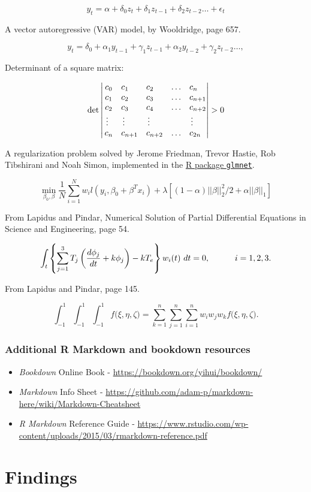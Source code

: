 \documentclass[12pt,oneside]{chicagocapstone}
\begin{document}
\[ y_t = \alpha + \delta_0 z_t + \delta_1 z_{t-1} + \delta_2 z_{t-2} \ldots + \epsilon_t\]

A vector autoregressive (VAR) model, by Wooldridge, page 657.

\[ y_t = \delta_0 + \alpha_1 y_{t-1} + \gamma_1 z_{t-1} + \alpha_2 y_{t-2} + \gamma_2 z_{t-2} \ldots,\]
\newpage

Determinant of a square matrix:

\[\det\left|\,\begin{matrix}%
c_0&c_1\hfill&c_2\hfill&\ldots&c_n\hfill\cr
c_1&c_2\hfill&c_3\hfill&\ldots&c_{n+1}\hfill\cr
c_2&c_3\hfill&c_4\hfill&\ldots&c_{n+2}\hfill\cr
\,\vdots\hfill&\,\vdots\hfill&
  \,\vdots\hfill&&\,\vdots\hfill\cr
c_n&c_{n+1}\hfill&c_{n+2}\hfill&\ldots&c_{2n}\hfill\cr
\end{matrix}\right|>0\]
\bigskip

A regularization problem solved by Jerome Friedman, Trevor Hastie, Rob Tibshirani and Noah Simon, implemented in the \href{https://cran.r-project.org/web/packages/glmnet/index.html}{R package \texttt{glmnet}}.

\[ \min_{\beta_0,\beta} \frac{1}{N}\sum_{i=1}^N w_il(y_i,\beta_0+\beta^Tx_i)+\lambda \left[(1-\alpha) ||\beta||_2^2/2+\alpha||\beta||_1\right]\]

\bigskip

From Lapidus and Pindar, Numerical Solution of Partial Differential Equations in Science and Engineering, page 54.

\[\int_t\left\{\sum_{j=1}^3 T_j \left({d\phi_j\over dt}+k\phi_j\right)-kT_e\right\}w_i(t)\ dt=0, \qquad\quad i=1,2,3.\]

\bigskip

From Lapidus and Pindar, page 145.

\[\int_{-1}^1\!\int_{-1}^1\!\int_{-1}^1 f\big(\xi,\eta,\zeta\big) = \sum_{k=1}^n\sum_{j=1}^n\sum_{i=1}^n w_i w_j w_k f\big( \xi,\eta,\zeta\big).\]

\hypertarget{additional-r-markdown-and-bookdown-resources}{%
\subsection*{Additional R Markdown and bookdown resources}\label{additional-r-markdown-and-bookdown-resources}}
\begin{itemize}
\item
  \emph{Bookdown} Online Book - \url{https://bookdown.org/yihui/bookdown/}
\item
  \emph{Markdown} Info Sheet - \url{https://github.com/adam-p/markdown-here/wiki/Markdown-Cheatsheet}
\item
  \emph{R Markdown} Reference Guide - \url{https://www.rstudio.com/wp-content/uploads/2015/03/rmarkdown-reference.pdf}
\end{itemize}
\hypertarget{findings}{%
\chapter*{Findings}\label{findings}}
\end{document}
